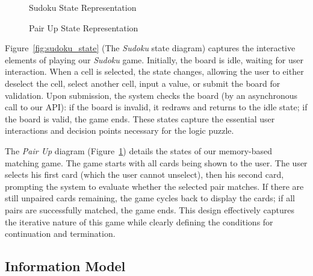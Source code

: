 \documentclass[11pt,a4paper]{article}
\newcommand{\inputdiagram}[1]{}
\newcommand{\textwidthdiagram}[2][1]{%
  \resizebox{#1\textwidth}{!}{\inputdiagram{#2}}%
}
\begin{document}
\begin{figure}[H]
    \centering
    \begin{minipage}[b]{0.48\textwidth}
        \centering
        \textwidthdiagram{sudoku_state.tex}
        \caption{Sudoku State Representation}
        \label{fig:sudoku_state}
    \end{minipage}
    \hfil
    \begin{minipage}[b]{0.48\textwidth}
        \centering
        \textwidthdiagram{pair_up_state.tex}
        \caption{Pair Up State Representation}
        \label{fig:pair_up_state}
    \end{minipage}
\end{figure}

Figure~\ref{fig:sudoku_state} (The \textit{Sudoku} state diagram) captures
the interactive elements of playing our \textit{Sudoku} game. Initially, the board
is idle, waiting for user interaction. When a cell is selected, the state
changes, allowing the user to either deselect the cell, select another
cell, input a value, or submit the board for validation. Upon submission,
the system checks the board (by an asynchronous call to our API): if the
board is invalid, it redraws and returns to the idle state; if the board
is valid, the game ends. These states capture the essential user interactions
and decision points necessary for the logic puzzle.

The \textit{Pair Up} diagram (Figure~\ref{fig:pair_up_state}) details the
states of our memory-based matching game. The game starts with all cards being
shown to the user. The user selects his first card (which the user cannot
unselect), then his second card, prompting the system to evaluate whether the
selected pair matches. If there are still unpaired cards remaining, the game cycles
back to display the cards; if all pairs are successfully matched,
the game ends. This design effectively captures the iterative nature of this
game while clearly defining the conditions for continuation and termination.


\subsection{Information Model}
\end{document}

